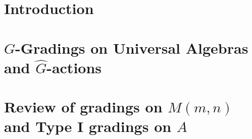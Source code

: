 \documentclass[12pt]{pdfathesis}
\begin{document}
%
%

%
\begin{prefatory}
\end{prefatory}
%
\chapter{Introduction}

%
\chapter{$G$-Gradings on Universal Algebras and $\widehat G$-actions}
\chapter{Review of gradings on $M(m,n)$ and Type I gradings on $A$}

%

\end{document}
